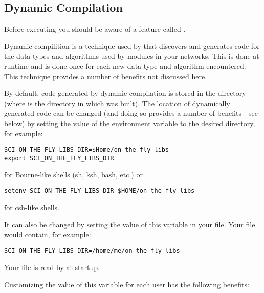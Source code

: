 \subsection{Dynamic Compilation}
\label{sec:dyncomp}

Before executing \sr{} you should be aware of a feature called
.

Dynamic compilition is a technique used by \sr{} that discovers and
generates code for the data types and algorithms used by modules in
your networks.  This is done at runtime and is done once for each new
data type and algorithm encountered.  This technique provides a number
of benefits not discussed here.

By default, code generated by dynamic compilation is stored in the
directory  (where
 is the directory in which \sr{} was built).  The
location of dynamically generated code can be changed (and doing so
provides a number of benefits---see below) by setting the value of the
environment variable  to the
desired directory, for example:

\begin{verbatim}
SCI_ON_THE_FLY_LIBS_DIR=$Home/on-the-fly-libs
export SCI_ON_THE_FLY_LIBS_DIR
\end{verbatim}

for Bourne-like shells (sh, ksh, bash, etc.) or

\begin{verbatim}
setenv SCI_ON_THE_FLY_LIBS_DIR $HOME/on-the-fly-libs
\end{verbatim}

for csh-like shells.

It can also be changed by setting the value of this variable in
your 
file. Your  file would contain, for example:

\begin{verbatim}
SCI_ON_THE_FLY_LIBS_DIR=/home/me/on-the-fly-libs
\end{verbatim}

Your  file is read by \sr{} at startup.

Customizing the value of this variable for each \sr{} user has
the following benefits:

